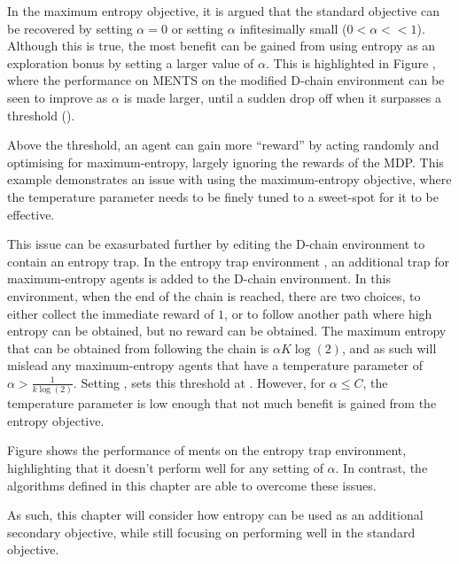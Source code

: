     In the maximum entropy objective, it is argued that the standard objective can be recovered by setting $\alpha=0$ or setting $\alpha$ infitesimally small ($0<\alpha<<1$). Although this is true, the most benefit can be gained from using entropy as an exploration bonus by setting a larger value of $\alpha$. This is highlighted in Figure , where the performance on MENTS on the modified D-chain environment can be seen to improve as $\alpha$ is made larger, until a sudden drop off when it surpasses a threshold ().
     
    Above the threshold, an agent can gain more ``reward'' by acting randomly and optimising for maximum-entropy, largely ignoring the rewards of the MDP. This example demonstrates an issue with using the maximum-entropy objective, where the temperature parameter needs to be finely tuned to a sweet-spot for it to be effective.

    This issue can be exasurbated further by editing the D-chain environment to contain an entropy trap. In the entropy trap environment , an additional trap for maximum-entropy agents is added to the D-chain environment. In this environment, when the end of the chain is reached, there are two choices, to either collect the immediate reward of $1$, or to follow another path where high entropy can be obtained, but no reward can be obtained. The maximum entropy that can be obtained from following the chain is $\alpha K \log(2)$, and as such will mislead any maximum-entropy agents that have a temperature parameter of $\alpha > \frac{1}{k\log(2)}$. Setting , sets this threshold at . However, for $\alpha \leq C$, the temperature parameter is low enough that not much benefit is gained from the entropy objective.

    Figure  shows the performance of ments on the entropy trap environment, highlighting that it doesn't perform well for any setting of $\alpha$. In contrast, the algorithms defined in this chapter are able to overcome these issues.
    
    As such, this chapter will consider how entropy can be used as an additional secondary objective, while still focusing on performing well in the standard objective.











